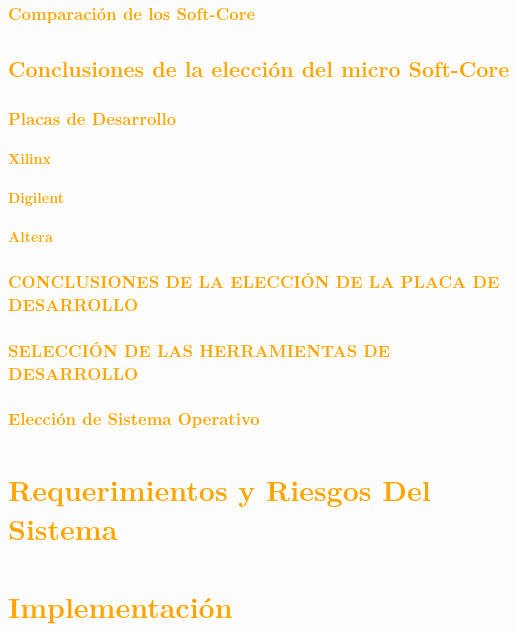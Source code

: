\documentclass[a4paper,11pt]{article}
\begin{document}
		\subsubsection{\textcolor{orange}{Comparación de los Soft-Core}} 
	 	\subsection{\textcolor{orange}{Conclusiones de la elección del micro Soft-Core}}
 		\subsubsection{\textcolor{orange}{Placas de Desarrollo}}
			\paragraph{\textcolor{orange}{Xilinx}}
			\paragraph{\textcolor{orange}{Digilent}} 	 
			\paragraph{\textcolor{orange}{Altera}}
 		\subsubsection{\textcolor{orange}{CONCLUSIONES DE LA ELECCIÓN DE LA PLACA DE DESARROLLO}}
 		\subsubsection{\textcolor{orange}{SELECCIÓN DE LAS HERRAMIENTAS DE DESARROLLO}} 	 
 		\subsubsection{\textcolor{orange}{Elección de Sistema Operativo}}
			
\section{\textcolor{orange}{Requerimientos y Riesgos Del Sistema}}

\section{\textcolor{orange}{Implementación}}
\end{document}
